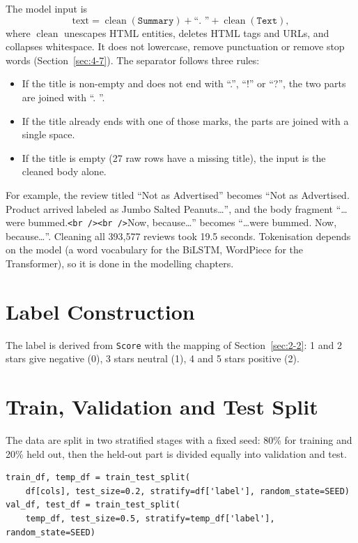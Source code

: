 The model input is
\begin{equation*}
    \text{text} = \operatorname{clean}(\texttt{Summary}) + \text{``. ''} + \operatorname{clean}(\texttt{Text}),
\end{equation*}
where $\operatorname{clean}$ unescapes HTML entities, deletes HTML tags and URLs, and collapses whitespace. It does not lowercase, remove punctuation or remove stop words (Section~\ref{sec:4-7}). The separator follows three rules:
\begin{itemize}
    \item If the title is non-empty and does not end with ``.'', ``!'' or ``?'', the two parts are joined with ``. ''.
    \item If the title already ends with one of those marks, the parts are joined with a single space.
    \item If the title is empty (27 raw rows have a missing title), the input is the cleaned body alone.
\end{itemize}
For example, the review titled ``Not as Advertised'' becomes ``Not as Advertised. Product arrived labeled as Jumbo Salted Peanuts\ldots'', and the body fragment ``\ldots were bummed.\texttt{<br />}\texttt{<br />}Now, because\ldots'' becomes ``\ldots were bummed. Now, because\ldots''. Cleaning all 393{,}577 reviews took 19.5 seconds. Tokenisation depends on the model (a word vocabulary for the BiLSTM, WordPiece for the Transformer), so it is done in the modelling chapters.

\section{Label Construction}
\label{sec:5-4}

The label is derived from \texttt{Score} with the mapping of Section~\ref{sec:2-2}: 1 and 2 stars give negative (0), 3 stars neutral (1), 4 and 5 stars positive (2).

\section{Train, Validation and Test Split}
\label{sec:5-5}

The data are split in two stratified stages with a fixed seed: 80\% for training and 20\% held out, then the held-out part is divided equally into validation and test.

\begin{lstlisting}
train_df, temp_df = train_test_split(
    df[cols], test_size=0.2, stratify=df['label'], random_state=SEED)
val_df, test_df = train_test_split(
    temp_df, test_size=0.5, stratify=temp_df['label'], random_state=SEED)
\end{lstlisting}

